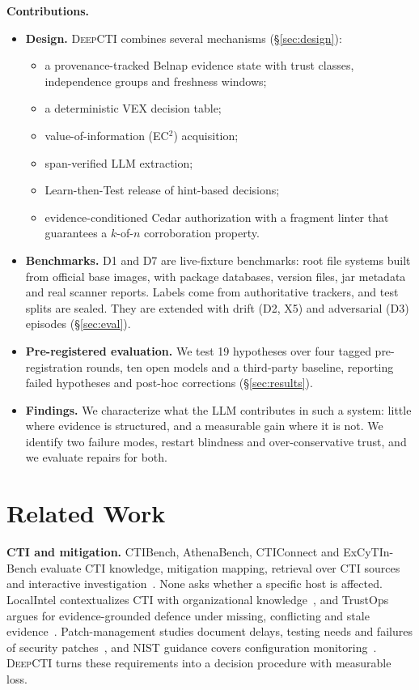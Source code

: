 \documentclass[conference]{IEEEtran}
\newcommand{\DC}{\textsc{DeepCTI}}
\begin{document}
\textbf{Contributions.}
\begin{itemize}
\item \textbf{Design.} \DC{} combines several mechanisms (\S\ref{sec:design}):
  \begin{itemize}
  \item a provenance-tracked Belnap evidence state with trust classes, independence groups and
    freshness windows;
  \item a deterministic VEX decision table;
  \item value-of-information (EC$^2$) acquisition;
  \item span-verified LLM extraction;
  \item Learn-then-Test release of hint-based decisions;
  \item evidence-conditioned Cedar authorization with a fragment linter that guarantees a $k$-of-$n$
    corroboration property.
  \end{itemize}
\item \textbf{Benchmarks.} D1 and D7 are live-fixture benchmarks: root file systems built from official
  base images, with package databases, version files, jar metadata and real scanner reports. Labels come
  from authoritative trackers, and test splits are sealed. They are extended with drift (D2, X5) and adversarial (D3) episodes (\S\ref{sec:eval}).
\item \textbf{Pre-registered evaluation.} We test 19 hypotheses over four tagged pre-registration rounds,
  ten open models and a third-party baseline, reporting failed hypotheses and post-hoc corrections
  (\S\ref{sec:results}).
\item \textbf{Findings.} We characterize what the LLM contributes in such a system: little where evidence is
  structured, and a measurable gain where it is not. We identify two failure modes, restart blindness and
  over-conservative trust, and we evaluate repairs for both.
\end{itemize}

\section{Related Work}

\textbf{CTI and mitigation.} CTIBench, AthenaBench, CTIConnect and ExCyTIn-Bench evaluate CTI knowledge,
mitigation mapping, retrieval over CTI sources and interactive
investigation~\cite{alam2024ctibench,alam2025athenabench,cheng2025cticonnect,wu2025excytin}. None asks
whether a specific host is affected. LocalIntel contextualizes CTI with organizational
knowledge~\cite{mitra2024localintel}, and TrustOps argues for evidence-grounded defence under missing,
conflicting and stale evidence~\cite{malamas2026trustops}. Patch-management studies document delays,
testing needs and failures of security
patches~\cite{dissanayake2022automation,dissanayake2022delays,li2017securitypatches,jenkins2024patching},
and NIST guidance covers configuration monitoring~\cite{johnson2011configuration,dempsey2011monitoring}.
\DC{} turns these requirements into a decision procedure with measurable loss.
\end{document}
